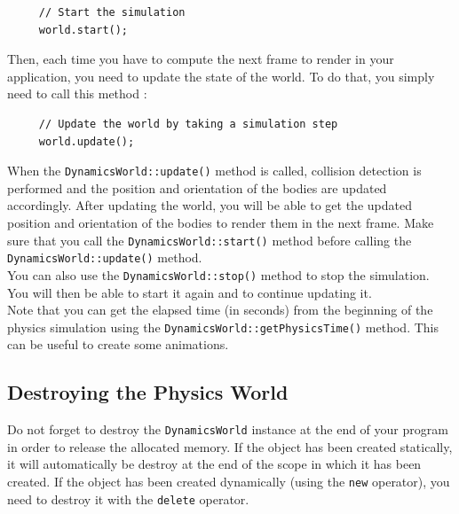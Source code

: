 \documentclass[a4paper,12pt]{article}
\begin{document}
    \begin{lstlisting}
     // Start the simulation
     world.start();
  \end{lstlisting}

    \vspace{0.6cm}

    Then, each time you have to compute the next frame to render in your application, you need to update the state of the world. To do that, you simply need to call this method : \\

    \begin{lstlisting}
     // Update the world by taking a simulation step
     world.update();
  \end{lstlisting}

    \vspace{0.6cm}

    When the \texttt{DynamicsWorld::update()} method is called, collision detection is performed and the position and orientation of the bodies are updated accordingly.
    After updating the world, you will be able to get the updated position and orientation of the bodies to render them in the next frame. Make sure that you call
    the \texttt{DynamicsWorld::start()} method before calling the \texttt{DynamicsWorld::update()} method. \\

    You can also use the \texttt{DynamicsWorld::stop()} method to stop the simulation. You will then be able to start it again and to continue updating it. \\

    Note that you can get the elapsed time (in seconds) from the beginning of the physics simulation using the \texttt{DynamicsWorld::getPhysicsTime()} method. This can be useful to
    create some animations.

    \subsection{Destroying the Physics World}

    Do not forget to destroy the \texttt{DynamicsWorld} instance at the end of your program in order to release the allocated memory. If the object has been created statically, it will
    automatically be destroy at the end of the scope in which it has been created. If the object has been created dynamically (using the \texttt{new} operator), you need to destroy
    it with the \texttt{delete} operator.
\end{document}
